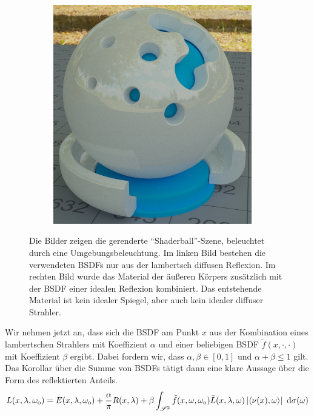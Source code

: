 \begin{figure}[h]
\begin{subfigure}[b]{0.5\textwidth}
				\includegraphics[width=0.95\textwidth]{pic/shaderball-bsdf_sum-specular.png}
			\end{subfigure}
			\caption{Die Bilder zeigen die gerenderte \enquote{Shaderball}-Szene, beleuchtet durch eine Umgebungsbeleuchtung. Im linken Bild bestehen die verwendeten BSDFs nur aus der lambertsch diffusen Reflexion. Im rechten Bild wurde das Material der äußeren Körpers zusätzlich mit der BSDF einer idealen Reflexion kombiniert. Das entstehende Material ist kein idealer Spiegel, aber auch kein idealer diffuser Strahler.}
			\label{fig:shaderball-bsdf-sum}
		\end{figure}

		Wir nehmen jetzt an, dass sich die BSDF am Punkt $x$ aus der Kombination eines lambertschen Strahlers mit Koeffizient $\alpha$ und einer beliebigen BSDF $\tilde{f}(x,\cdot,\cdot)$ mit Koeffizient $\beta$ ergibt.
		Dabei fordern wir, dass $\alpha,\beta\in[0,1]$ und $\alpha +\beta\leq 1$ gilt.
		Das Korollar über die Summe von BSDFs tätigt dann eine klare Aussage über die Form des reflektierten Anteils.
		\[
			L(x,\lambda,\omega_{\mathrm{o}}) = E(x,\lambda,\omega_{\mathrm{o}}) + \frac{\alpha}{\pi}R(x,\lambda) + \beta \int_{\mathscr{S}^{2}}^{} \tilde{f}(x,\omega,\omega_{\mathrm{o}})\tilde{L}(x,\lambda,\omega)\left\vert \left\langle \nu(x),\omega \right\rangle \right\vert\ \mathrm{d} \sigma(\omega)
		\]

